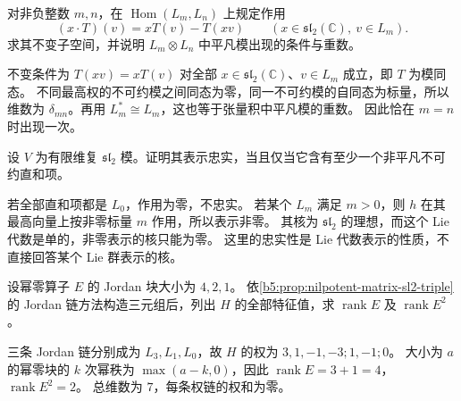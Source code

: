 \begin{exercise}\label{b5:ex:14-hom-invariants}
	对非负整数 \(m,n\)，在 \(\operatorname{Hom}(L_m,L_n)\) 上规定作用
	\[
		(x\cdot T)(v)=xT(v)-T(xv) \qquad(x\in\mathfrak{sl}_2(\mathbb C),\ v\in L_m).
	\]
	求其不变子空间，并说明 \(L_m\otimes L_n\) 中平凡模出现的条件与重数。
\end{exercise}
\begin{solution}
	不变条件为 \(T(xv)=xT(v)\) 对全部 \(x\in\mathfrak{sl}_2(\mathbb C)\)、\(v\in L_m\) 成立，即 \(T\) 为模同态。 不同最高权的不可约模之间同态为零，同一不可约模的自同态为标量，所以维数为 \(\delta_{mn}\)。再用 \(L_m^*\cong L_m\)，这也等于张量积中平凡模的重数。 因此恰在 \(m=n\) 时出现一次。
\end{solution}

\begin{exercise}\label{b5:ex:14-faithfulness}
	设 \(V\) 为有限维复 \(\mathfrak{sl}_2\) 模。证明其表示忠实，当且仅当它含有至少一个非平凡不可约直和项。
\end{exercise}
\begin{solution}
	若全部直和项都是 \(L_0\)，作用为零，不忠实。 若某个 \(L_m\) 满足 \(m>0\)，则 \(h\) 在其最高向量上按非零标量 \(m\) 作用，所以表示非零。 其核为 \(\mathfrak{sl}_2\) 的理想，而这个 Lie 代数是单的，非零表示的核只能为零。 这里的忠实性是 Lie 代数表示的性质，不直接回答某个 Lie 群表示的核。
\end{solution}

\begin{exercise}\label{b5:ex:14-jordan-blocks}
	设幂零算子 \(E\) 的 Jordan 块大小为 \(4,2,1\)。 依\cref{b5:prop:nilpotent-matrix-sl2-triple}的 Jordan 链方法构造三元组后，列出 \(H\) 的全部特征值，求 \(\operatorname{rank}E\) 及 \(\operatorname{rank}E^2\)。
\end{exercise}
\begin{solution}
	三条 Jordan 链分别成为 \(L_3,L_1,L_0\)，故 \(H\) 的权为 \(3,1,-1,-3;1,-1;0\)。 大小为 \(a\) 的幂零块的 \(k\) 次幂秩为 \(\max(a-k,0)\)，因此 \(\operatorname{rank}E=3+1=4\)， \(\operatorname{rank}E^2=2\)。 总维数为 \(7\)，每条权链的权和为零。
\end{solution}

